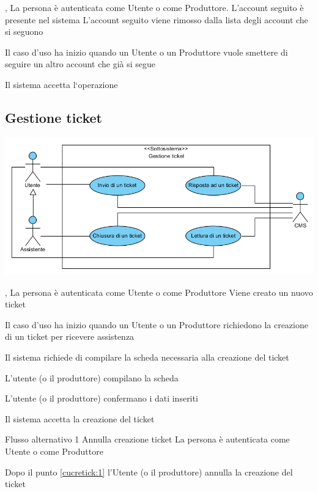 \tabcuvspace

{, }
{La persona è autenticata come Utente o come Produttore. L'account seguito è presente nel sistema}
{L'account seguito viene rimosso dalla lista degli account che si seguono}
{\begin{enumCU}
	\item Il caso d'uso ha inizio quando un Utente o un Produttore vuole smettere di seguire un altro account che già si segue
	\item Il sistema accetta l`operazione
\end{enumCU}}

\subsection{Gestione ticket}
\begin{center}
   \includegraphics[width=\textwidth]{assets/visualParadigm/GestioneTicket}
\end{center}
{, }
{La persona è autenticata come Utente o come Produttore}
{Viene creato un nuovo ticket}
{\begin{enumCU}
	\item Il caso d'uso ha inizio quando un Utente o un Produttore richiedono la creazione di un ticket per ricevere assistenza
	\item Il sistema richiede di compilare la scheda necessaria alla creazione del ticket
	\item L'utente (o il produttore) compilano la scheda \label{cucretick:1}
	\item L'utente (o il produttore) confermano i dati inseriti
	\item Il sistema accetta la creazione del ticket
\end{enumCU}}
%
{Flusso alternativo 1}%
{Annulla creazione ticket}%
{La persona è autenticata come Utente o come Produttore}%
{\postNulle}%
{\begin{enumCU}
		\item Dopo il punto \ref{cucretick:1} l'Utente (o il produttore) annulla la creazione del ticket
	\end{enumCU}}%

